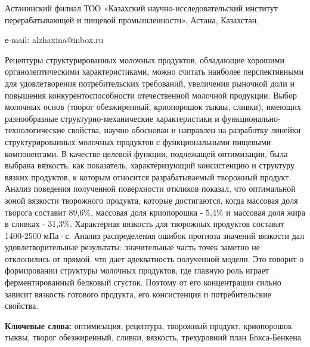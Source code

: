 \begin{affiliation}
Астанинский филиал ТОО «Казахский научно-исследовательский институт перерабатывающей и пищевой промышленности», Астана, Казахстан,

е-mail: alzhaxina@inbox.ru
\end{affiliation}

Рецептуры структурированных молочных продуктов, обладающие хорошими
органолептическими характеристиками, можно считать наиболее
перспективными для удовлетворения потребительских требований, увеличения
рыночной доли и повышения конкурентоспособности отечественной молочной
продукции. Выбор молочных основ (творог обезжиренный, криопорошок тыквы,
сливки), имеющих разнообразные структурно-механические характеристики и
функционально-технологич\-еские свойства, научно обоснован и направлен на
разработку линейки структурированных молочных продуктов с
функциональными пищевыми компонентами. В качестве целевой функции,
подлежащей оптимизации, была выбрана вязкость, как показатель,
характеризующий консистенцию и структуру вязких продуктов, к которым
относится разрабатываемый творожный продукт. Анализ поведения полученной
поверхности откликов показал, что оптимальной зоной вязкости творожного
продукта, которые достигаются, когда массовая доля творога составит
89,6\%, массовая доля криопорошка - 5,4\% и массовая доля жира в сливках
- 31,3\%. Характерная вязкость для творожных продуктов составит
1400-2500 мПа·с. Анализ распределения ошибок прогноза значений вязкости
дал удовлетворительные результаты: значительные часть точек заметно не
отклонились от прямой, что дает адекватность полученной модели. Это
говорит о формировании структуры молочных продуктов, где главную роль
играет ферментированный белковый сгусток. Поэтому от его концентрации
сильно зависит вязкость готового продукта, его консистенция и
потребительские свойства.

{\bfseries Ключевые слова:} оптимизация, рецептура, творожный продукт,
криопорошок тыквы, творог обезжиренный, сливки, вязкость, трехуровний
план Бокса-Бенкена.

